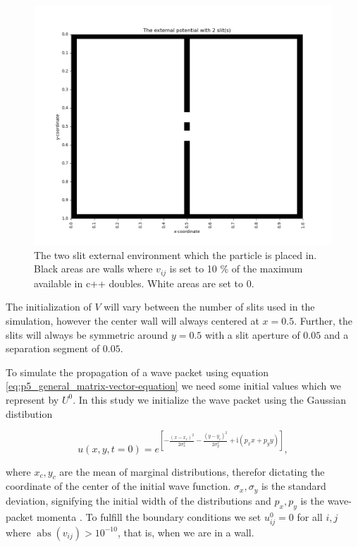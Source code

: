 \documentclass[../main_proj5.tex]{subfiles}
\begin{document}
\begin{figure}[h!]
    \centering
    \includegraphics[width=0.9\linewidth]{Project 5/figures/2slits.png}
    \caption{The two slit external environment which the particle is placed in. Black areas are walls where $v_{ij}$ is set to 10 \% of the maximum available in c++ doubles. White areas are set to 0. }
    \label{fig:two-slit_setup}
\end{figure}

\noindent The initialization of $V$ will vary between the number of slits used in the simulation, however the center wall will always centered at $x=0.5$. Further, the slits will always be symmetric around $y=0.5$ with a slit aperture of $0.05$ and a separation segment of $0.05$.  

To simulate the propagation of a wave packet using equation \eqref{eq:p5_general_matrix-vector-equation} we need some initial values which we represent by $U^{0}$. In this study we initialize the wave packet using the Gaussian distibution 

\begin{equation}
\label{eq:p5_gaussian_wave}
    u(x,y, t=0) = e^{\left[ 
    - \frac{(x-x_c)^{2}}{2\sigma_x^{2}} - \frac{(y-y_c)^{2}}{2\sigma_y^{2}} +\text{i}(p_x x + p_y y)
    \right]},
\end{equation}

\noindent where $x_c, y_c$ are the mean of marginal distributions, therefor dictating the coordinate of the center of the initial wave function. $\sigma_x, \sigma_y$ is the standard deviation, signifying the initial width of the distributions and $p_x, p_y$ is the wave-packet momenta \cite{prosjekttbeskrivelse5}. To fulfill the boundary conditions we set $u_{ij}^{0} = 0$ for all $i, j$ where $\operatorname{abs}(v_{ij}) > 10^{-10}$, that is, when we are in a wall. 
\end{document}
